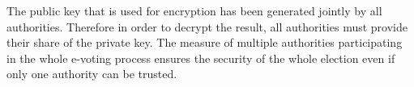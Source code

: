 The public key that is used for encryption has been generated jointly by all authorities. Therefore in order to decrypt the result, all authorities must provide their share of the private key. The measure of multiple authorities participating in the whole e-voting process ensures the security of the whole election even if only one authority can be trusted.
